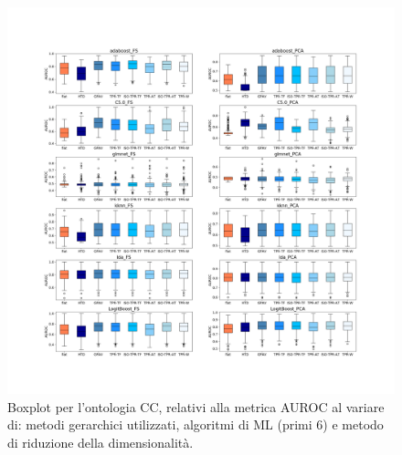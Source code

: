 \documentclass[12pt]{report}
\begin{document}
\begin{appendices}
\begin{figure}[h]
 \hspace*{-2.6cm}
\includegraphics[scale=0.34]{./images/CC_AUC_1.png}
\caption{\footnotesize{Boxplot per l'ontologia CC, relativi alla metrica AUROC al variare di: metodi gerarchici utilizzati, algoritmi di ML (primi 6) e metodo di riduzione della dimensionalità.}}
\label{CC_AUC_1}
\end{figure}


\end{appendices}
\end{document}
